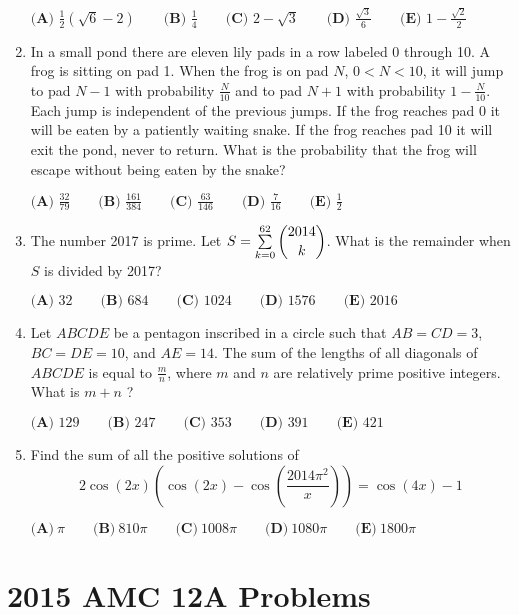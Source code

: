\documentclass{article}
\begin{document}
\begin{enumerate}[label=\arabic*., itemsep=0.5em]
\( \textbf{(A) }\frac{1}{2}(\sqrt{6}-2)\qquad\textbf{(B) }\frac{1}{4}\qquad\textbf{(C) }2-\sqrt{3}\qquad\textbf{(D) }\frac{\sqrt{3}}{6}\qquad\textbf{(E) } 1-\frac{\sqrt{2}}{2}\)\par \vspace{0.5em}\item In a small pond there are eleven lily pads in a row labeled 0 through 10.  A frog is sitting on pad 1.  When the frog is on pad \(N\), \(0<N<10\), it will jump to pad \(N-1\) with probability \(\frac{N}{10}\) and to pad \(N+1\) with probability \(1-\frac{N}{10}\).  Each jump is independent of the previous jumps.  If the frog reaches pad 0 it will be eaten by a patiently waiting snake.  If the frog reaches pad 10 it will exit the pond, never to return.  What is the probability that the frog will escape without being eaten by the snake?

\(\textbf{(A) }\frac{32}{79}\qquad
\textbf{(B) }\frac{161}{384}\qquad
\textbf{(C) }\frac{63}{146}\qquad
\textbf{(D) }\frac{7}{16}\qquad
\textbf{(E) }\frac{1}{2}\qquad\)\par \vspace{0.5em}\item The number 2017 is prime.  Let \(S = \sum \limits_{k=0}^{62} \dbinom{2014}{k}\).  What is the remainder when \(S\) is divided by 2017?

\(\textbf{(A) }32\qquad
\textbf{(B) }684\qquad
\textbf{(C) }1024\qquad
\textbf{(D) }1576\qquad
\textbf{(E) }2016\qquad\)\par \vspace{0.5em}\item Let \(ABCDE\) be a pentagon inscribed in a circle such that \(AB = CD = 3\), \(BC = DE = 10\), and \(AE= 14\).  The sum of the lengths of all diagonals of \(ABCDE\) is equal to \(\frac{m}{n}\), where \(m\) and \(n\) are relatively prime positive integers.  What is \(m+n\) ?

\(\textbf{(A) }129\qquad
\textbf{(B) }247\qquad
\textbf{(C) }353\qquad
\textbf{(D) }391\qquad
\textbf{(E) }421\qquad\)\par \vspace{0.5em}\item Find the sum of all the positive solutions of 
\begin{equation*}
2\cos(2x) \left(\cos(2x) - \cos\left( \frac{2014\pi^2}{x} \right)\right) = \cos(4x) - 1
\end{equation*}


\( \textbf{(A)}\ \pi \qquad\textbf{(B)}\ 810\pi  \qquad\textbf{(C)}\ 1008\pi \qquad\textbf{(D)}\ 1080 \pi \qquad\textbf{(E)}\ 1800\pi \)\par \vspace{0.5em}\end{enumerate}\newpage\section*{2015 AMC 12A Problems}
\end{document}
